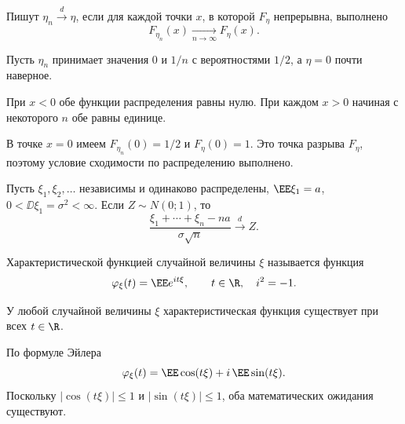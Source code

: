
\begin{definition}
Пишут $\eta_n\xrightarrow{d}\eta$, если для каждой точки $x$, в которой
$F_\eta$ непрерывна, выполнено
\[
 F_{\eta_n}(x)\xrightarrow[n\to\infty]{}F_\eta(x).
\]
\end{definition}

\begin{example}
Пусть $\eta_n$ принимает значения $0$ и $1/n$ с вероятностями $1/2$,
а $\eta=0$ почти наверное.

\smallskip
При $x<0$ обе функции распределения равны нулю.
При каждом $x>0$ начиная с некоторого $n$ обе равны единице.

\smallskip
В точке $x=0$ имеем $F_{\eta_n}(0)=1/2$ и $F_\eta(0)=1$.
Это точка разрыва $F_\eta$, поэтому условие сходимости по распределению выполнено.
\end{example}

\begin{theorem}
Пусть $\xi_1,\xi_2,\ldots$ независимы и одинаково распределены,
$\EE\xi_1=a$, $0<\DD\xi_1=\sigma^2<\infty$. Если $Z\sim N(0;1)$, то
\[
 \frac{\xi_1+\cdots+\xi_n-na}{\sigma\sqrt n}\xrightarrow{d}Z.
\]
\end{theorem}

\begin{definition}
Характеристической функцией случайной величины $\xi$ называется функция
\[
 \varphi_\xi(t)=\EE e^{it\xi},\qquad t\in\R,\quad i^2=-1.
\]
\end{definition}

\begin{theorem}
У любой случайной величины $\xi$ характеристическая функция существует при всех $t\in\R$.
\end{theorem}
\begin{Proof}
По формуле Эйлера
\[
 \varphi_\xi(t)=\EE\cos(t\xi)+i\,\EE\sin(t\xi).
\]
Поскольку $|\cos(t\xi)|\leq1$ и $|\sin(t\xi)|\leq1$, оба математических ожидания существуют.
\end{Proof}

